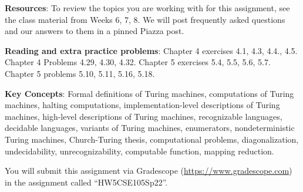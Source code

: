{\bf Resources}: To review the topics you are working with 
for this assignment, see the class material from Weeks 6, 7, 8.
We will post frequently asked questions and our answers to them in a 
pinned Piazza post.

{\bf Reading and extra practice problems}: Chapter 4 exercises 4.1, 4.3, 4.4., 4.5. 
Chapter 4 Problems 4.29, 4.30, 4.32.  Chapter 5 exercises 5.4, 5.5, 
5.6, 5.7. Chapter 5 problems 5.10, 5.11, 5.16, 5.18.

{\bf Key Concepts}: Formal definitions of Turing machines, computations of Turing machines,
halting computations, implementation-level descriptions of Turing machines, high-level descriptions
of Turing machines, recognizable languages, decidable languages, variants of Turing machines,
enumerators, nondeterministic Turing machines, Church-Turing thesis,
 computational problems, diagonalization, undecidability, unrecognizability, 
computable function, mapping reduction.

\instructions

You will submit this assignment via Gradescope
(\href{https://www.gradescope.com}{https://www.gradescope.com}) 
in the assignment called ``HW5CSE105Sp22''.

